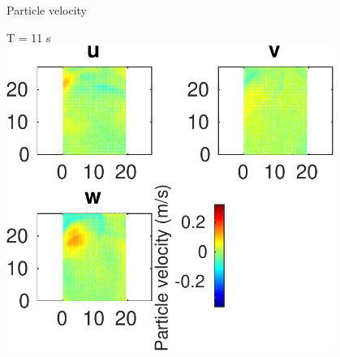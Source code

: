 \documentclass{beamer}
\begin{document}
\begin{frame}
 {Particle velocity}
 
 \centering \Large T = 11 s\\
 \includegraphics[width=0.8\textwidth]{images/horizontal_velo_00116}
 
\end{frame}
\end{document}
